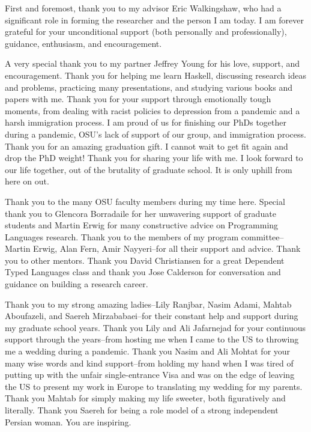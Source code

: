 %
First and foremost, thank you to my advisor Eric Walkingshaw, who had a significant
role in forming the researcher and the person I am today. 
I am forever grateful for your unconditional support
(both personally and professionally), guidance, enthusiasm, and encouragement. 

%
A very special thank you to my partner Jeffrey Young for his love, support, and 
encouragement. Thank you for helping me learn Haskell, discussing research ideas and problems,
practicing many presentations, and studying various books and papers with me. 
Thank you for your support through emotionally tough moments, from dealing with racist policies
to depression from a pandemic and a harsh immigration process. 
I am proud of us for finishing our PhDs together during a pandemic, OSU's lack of support of our group, and immigration process. 
Thank you for an amazing graduation gift. I cannot wait to get fit again and drop the PhD weight! 
Thank you for sharing your life with me.
I look forward to our life together, out of the brutality of graduate school. It is only uphill from here on out. 


Thank you to the many OSU faculty members during my time here. 
Special thank you to Glencora Borradaile for her unwavering support 
of graduate students and Martin Erwig for many constructive advice on 
Programming Languages research.
Thank you to the members of my program committee--Martin Erwig, 
Alan Fern, Amir Nayyeri--for all their support and advice. 
Thank you to other mentors. Thank you David Christiansen for a great Dependent Typed Languages class
and thank you Jose Calderson for conversation and guidance on building a research career.

Thank you to my strong amazing ladies--Lily Ranjbar, 
Nasim Adami, Mahtab Aboufazeli, and Saereh Mirzababaei--for their constant help and support during my graduate school years.
%
Thank you Lily and Ali Jafarnejad for your continuous support through the years--from 
hosting me when I came to the US to throwing me a wedding during a pandemic. 
%
Thank you Nasim 
and Ali Mohtat for your many wise words and kind support--from
holding my hand when I was tired 
of putting up with the unfair single-entrance Visa and was on the edge of leaving the US to 
present my work in Europe to translating my wedding for my parents.
%
Thank you Mahtab for simply making my life sweeter, both figuratively and literally. 
%
Thank you Saereh for being a role model of a strong independent Persian woman. You are inspiring.
% 

